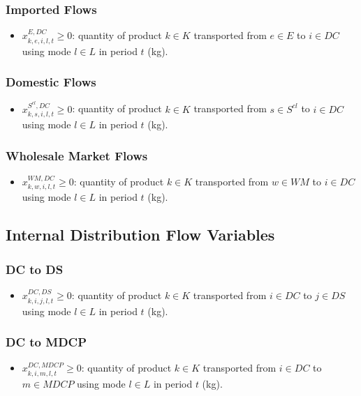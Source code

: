 \documentclass[12pt]{article}
\begin{document}
\subsubsection{Imported Flows}
\begin{itemize}
    \item $x^{E,DC}_{k,e,i,l,t} \geq 0$: quantity of product $k \in K$ transported from $e \in E$ to $i \in DC$ using mode $l \in L$ in period $t$ (kg).
\end{itemize}

\subsubsection{Domestic Flows}
\begin{itemize}
    \item $x^{S^{cl},DC}_{k,s,i,l,t} \geq 0$: quantity of product $k \in K$ transported from $s \in S^{cl}$ to $i \in DC$ using mode $l \in L$ in period $t$ (kg).
\end{itemize}

\subsubsection{Wholesale Market Flows}
\begin{itemize}
    \item $x^{WM,DC}_{k,w,i,l,t} \geq 0$: quantity of product $k \in K$ transported from $w \in WM$ to $i \in DC$ using mode $l \in L$ in period $t$ (kg).
\end{itemize}

\subsection{Internal Distribution Flow Variables}

\subsubsection{DC to DS}
\begin{itemize}
    \item $x^{DC,DS}_{k,i,j,l,t} \geq 0$: quantity of product $k \in K$ transported from $i \in DC$ to $j \in DS$ using mode $l \in L$ in period $t$ (kg).
\end{itemize}

\subsubsection{DC to MDCP}
\begin{itemize}
    \item $x^{DC,MDCP}_{k,i,m,l,t} \geq 0$: quantity of product $k \in K$ transported from $i \in DC$ to $m \in MDCP$ using mode $l \in L$ in period $t$ (kg).
\end{itemize}
\end{document}
